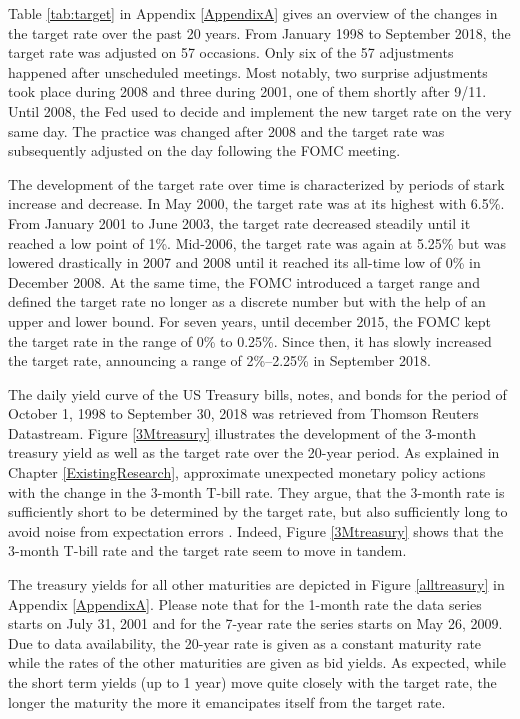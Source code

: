 \documentclass[11pt,a4paper,english,oneside]{book}
\numberwithin{equation}{chapter}
\begin{document}
Table \ref{tab:target} in Appendix \ref{AppendixA} gives an overview of the changes in the target rate over the past 20 years. From January 1998 to September 2018, the target rate was adjusted on 57 occasions. Only six of the 57 adjustments happened after unscheduled meetings. Most notably, two surprise adjustments took place during 2008 and three during 2001, one of them shortly after 9/11. Until 2008, the Fed used to decide and implement the new target rate on the very same day. The practice was changed after 2008 and the target rate was subsequently adjusted on the day following the FOMC meeting. 

The development of the target rate over time is characterized by periods of stark increase and decrease. In May 2000, the target rate was at its highest with 6.5\%. From January 2001 to June 2003, the target rate decreased steadily until it reached a low point of 1\%. Mid-2006, the target rate was again at 5.25\% but was lowered drastically in 2007 and 2008 until it reached its all-time low of 0\% in December 2008. At the same time, the FOMC introduced a target range and defined the target rate no longer as a discrete number but with the help of an upper and lower bound. For seven years, until december 2015, the FOMC kept the target rate in the range of 0\% to 0.25\%. Since then, it has slowly increased the target rate, announcing a range of 2\%--2.25\% in September 2018.
%

The daily yield curve of the US Treasury bills, notes, and bonds for the period of October 1, 1998 to September 30, 2018 was retrieved from Thomson Reuters Datastream. Figure \ref{3Mtreasury} illustrates the development of the 3-month treasury yield as well as the target rate over the 20-year period. As explained in Chapter \ref{ExistingResearch}, \citeauthor{Ellingsen.2003} approximate unexpected monetary policy actions with the change in the 3-month T-bill rate. They argue, that the 3-month rate is sufficiently short to be determined by the target rate, but also sufficiently long to avoid noise from expectation errors \citep[~p. 13]{Ellingsen.2003}. Indeed, Figure \ref{3Mtreasury} shows that the 3-month T-bill rate and the target rate seem to move in tandem.  

The treasury yields for all other maturities are depicted in Figure \ref{alltreasury} in Appendix \ref{AppendixA}. Please note that for the 1-month rate the data series starts on July 31, 2001 and for the 7-year rate the series starts on May 26, 2009. Due to data availability, the 20-year rate is given as a constant maturity rate while the rates of the other maturities are given as bid yields. As expected, while the short term yields (up to 1 year) move quite closely with the target rate, the longer the maturity the more it emancipates itself from the target rate. 
\end{document}
